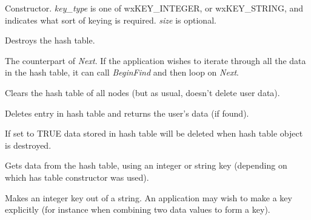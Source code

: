 Constructor. {\it key\_type} is one of wxKEY\_INTEGER, or wxKEY\_STRING,
and indicates what sort of keying is required. {\it size} is optional.



Destroys the hash table.



The counterpart of {\it Next}.  If the application wishes to iterate
through all the data in the hash table, it can call {\it BeginFind} and
then loop on {\it Next}.



Clears the hash table of all nodes (but as usual, doesn't delete user data).




Deletes entry in hash table and returns the user's data (if found).



If set to TRUE data stored in hash table will be deleted when hash table object
is destroyed.





Gets data from the hash table, using an integer or string key (depending on which
has table constructor was used).



Makes an integer key out of a string. An application may wish to make a key
explicitly (for instance when combining two data values to form a key).



